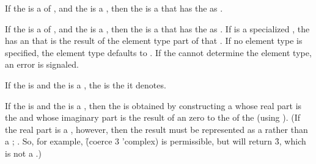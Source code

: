 If the  is a  of ,
and the  is a ,
then the  is a  
that has the   as .

If the  is a  of ,
and the  is a ,
then the  is a  
that has the   as .
If  is a specialized , 
the  has an  that is the result of
 the element type part of that  .
If no element type is specified, the element type defaults to .
If the  cannot determine the element type, an error is signaled.



If the  is 
and the  is a ,
the  is the  it denotes.



If the  is  
and the  is a ,
then the  is obtained by constructing a 
whose real part is the  and
whose imaginary part is the result of  an  zero
to the  of the  (using ).
(If the real part is a , however, 
then the result must be represented as a  rather
than a ; \seesection\RuleOfCanonRepForComplexRationals.
So, for example, \f{(coerce 3 'complex)} is permissible,
but will return \f{3}, which is not a .)


